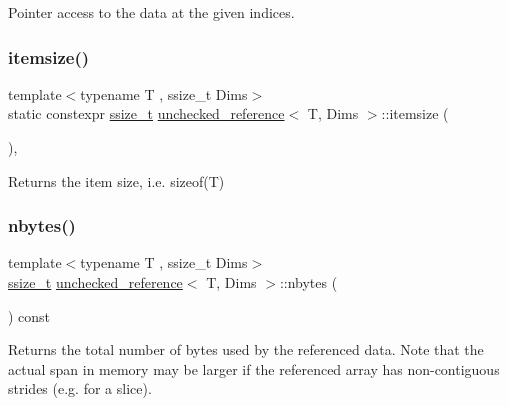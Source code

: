 Pointer access to the data at the given indices. 

\mbox{\label{classunchecked__reference_aef7c3ce5d4353713c19e71fe2afb8ff6}} 
\subsubsection{\texorpdfstring{itemsize()}{itemsize()}}
{\footnotesize\ttfamily template$<$typename T , ssize\+\_\+t Dims$>$ \\
static constexpr \mbox{\hyperlink{detail_2common_8h_ac430d16fc097b3bf0a7469cfd09decda}{ssize\+\_\+t}} \mbox{\hyperlink{classunchecked__reference}{unchecked\+\_\+reference}}$<$ T, Dims $>$\+::itemsize (\begin{DoxyParamCaption}{ }\end{DoxyParamCaption})\hspace{0.3cm}{\ttfamily [inline]}, {\ttfamily [static]}}



Returns the item size, i.\+e. sizeof(\+T) 

\mbox{\label{classunchecked__reference_a9c15e1b4f748ca5d8396e637c4d9abb4}} 
\subsubsection{\texorpdfstring{nbytes()}{nbytes()}}
{\footnotesize\ttfamily template$<$typename T , ssize\+\_\+t Dims$>$ \\
\mbox{\hyperlink{detail_2common_8h_ac430d16fc097b3bf0a7469cfd09decda}{ssize\+\_\+t}} \mbox{\hyperlink{classunchecked__reference}{unchecked\+\_\+reference}}$<$ T, Dims $>$\+::nbytes (\begin{DoxyParamCaption}{ }\end{DoxyParamCaption}) const\hspace{0.3cm}{\ttfamily [inline]}}

Returns the total number of bytes used by the referenced data. Note that the actual span in memory may be larger if the referenced array has non-\/contiguous strides (e.\+g. for a slice). \mbox{\label{classunchecked__reference_a732200223a8d47f248fb9bab843dbe7a}} 
